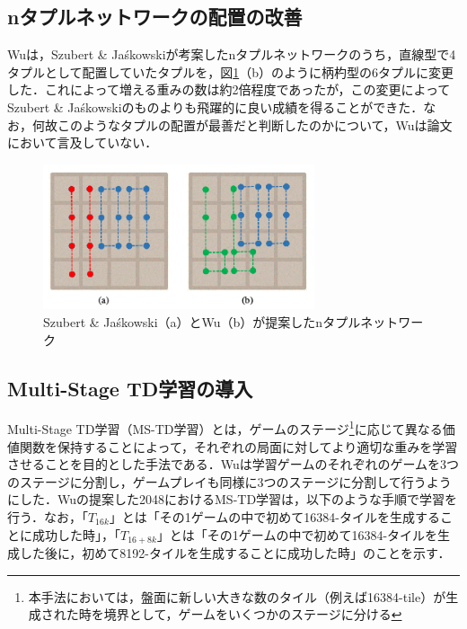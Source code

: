 \documentclass{suribt}
\begin{document}
\subsection{nタプルネットワークの配置の改善}
Wuは，Szubert \& Ja\'{s}kowskiが考案したnタプルネットワークのうち，直線型で4タプルとして配置していたタプルを，図\ref{figure_002}（b）のように柄杓型の6タプルに変更した．これによって増える重みの数は約2倍程度であったが，この変更によってSzubert \& Ja\'{s}kowskiのものよりも飛躍的に良い成績を得ることができた．なお，何故このようなタプルの配置が最善だと判断したのかについて，Wuは論文において言及していない．

\begin{figure}[t]
	\begin{center}
	\includegraphics[width=8cm]{figure_002.png}
	\caption{Szubert \& Ja\'{s}kowski（a）とWu（b）が提案したnタプルネットワーク}
	\label{figure_002}
	\end{center}
\end{figure}

\subsection{Multi-Stage TD学習の導入}
Multi-Stage TD学習（MS-TD学習）とは，ゲームのステージ\footnote{本手法においては，盤面に新しい大きな数のタイル（例えば16384-tile）が生成された時を境界として，ゲームをいくつかのステージに分ける}に応じて異なる価値関数を保持することによって，それぞれの局面に対してより適切な重みを学習させることを目的とした手法である．Wuは学習ゲームのそれぞれのゲームを3つのステージに分割し，ゲームプレイも同様に3つのステージに分割して行うようにした．Wuの提案した2048におけるMS-TD学習は，以下のような手順で学習を行う．なお，「$T_{16k}$」とは「その1ゲームの中で初めて16384-タイルを生成することに成功した時」，「$T_{16+8k}$」とは「その1ゲームの中で初めて16384-タイルを生成した後に，初めて8192-タイルを生成することに成功した時」のことを示す．
\end{document}
